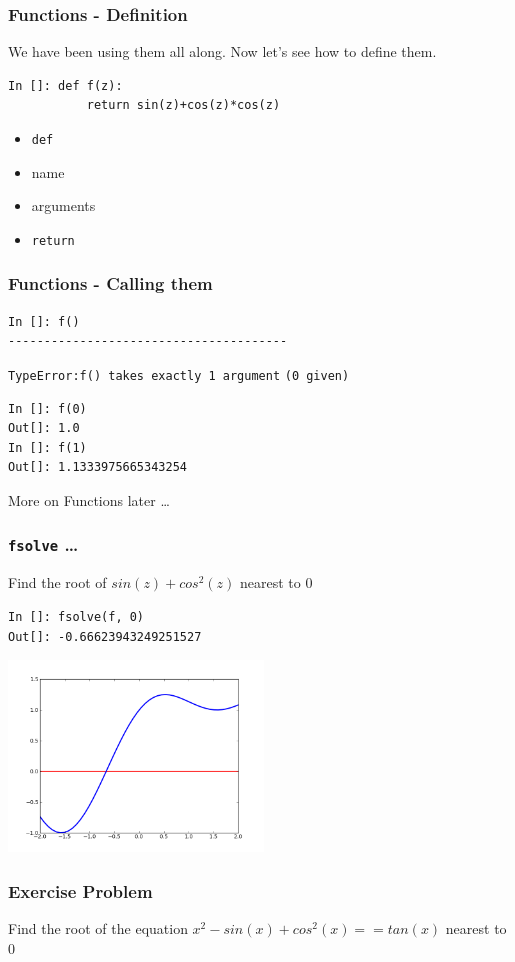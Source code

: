\documentclass[14pt,compress]{beamer}
\newcommand{\typ}[1]{\lstinline{#1}}
\begin{document}
\begin{frame}[fragile]
\frametitle{Functions - Definition}
We have been using them all along. Now let's see how to define them.
\begin{lstlisting}
In []: def f(z):
           return sin(z)+cos(z)*cos(z)
\end{lstlisting}
\begin{itemize}
\item \typ{def}
\item name
\item arguments
\item \typ{return}
\end{itemize}
\end{frame}

\begin{frame}[fragile]
\frametitle{Functions - Calling them}
\begin{lstlisting}
In []: f()
---------------------------------------
\end{lstlisting}
\alert{\typ{TypeError:}}\typ{f() takes exactly 1 argument}
\typ{(0 given)}
\begin{lstlisting}
In []: f(0)
Out[]: 1.0
In []: f(1)
Out[]: 1.1333975665343254
\end{lstlisting}
More on Functions later \ldots
\end{frame}

\begin{frame}[fragile]
\frametitle{\typ{fsolve} \ldots}
Find the root of $sin(z)+cos^2(z)$ nearest to $0$
\begin{lstlisting}
In []: fsolve(f, 0)
Out[]: -0.66623943249251527
\end{lstlisting}
\begin{center}
\includegraphics[height=2in, interpolate=true]{data/fsolve}    
\end{center}
\end{frame}

\begin{frame}[fragile]
  \frametitle{Exercise Problem}
  Find the root of the equation $x^2 - sin(x) + cos^2(x) == tan(x)$ nearest to $0$
\end{frame}
\end{document}
